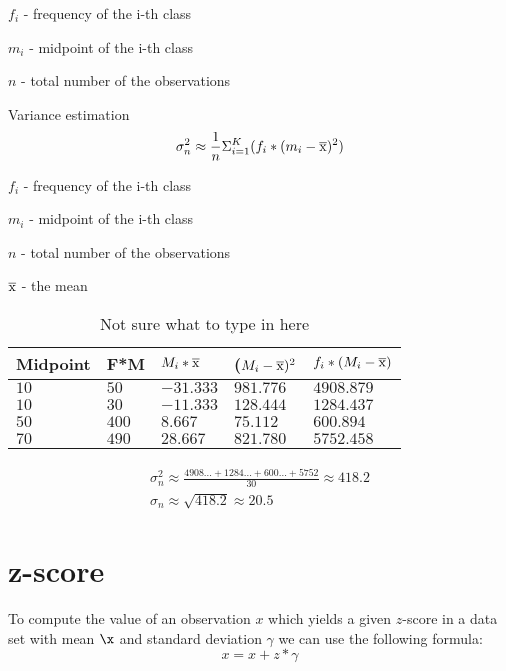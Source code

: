 \documentclass{article}
\begin{document}
$f_i$ - frequency of the i-th class

$m_i$ - midpoint of the i-th class

$n$ - total number of the observations

Variance estimation
\begin{equation}
  \sigma^2_n \approx \frac{1}{n}\Sigma^K_{i=1}(f_i * (m_i - \overline{\rm x})^2)
\end{equation}

$f_i$ - frequency of the i-th class

$m_i$ - midpoint of the i-th class

$n$ - total number of the observations

$\overline{\rm x}$ - the mean

\begin{table}[htbp]
  \centering
  \begin{tabular}{|l|l|l|l|l|}
    \hline
    \textbf{Midpoint} & \textbf{F*M} & \textbf{$M_i * \overline{\rm x}$} & \textbf{($M_i - \overline{\rm x})^2$} & \textbf{$f_i * (M_i - \overline{\rm x})$} \\
    \hline
    $10$ & $50$ & $-31.333$ & $981.776$ & $4908.879$ \\
    \hline
    $10$ & $30$ & $-11.333$ & $128.444$ & $1284.437$ \\
    \hline
    $50$ & $400$ & $8.667$ & $75.112$ & $600.894$ \\
    \hline
    $70$ & $490$ & $28.667$ & $821.780$ & $5752.458$  \\
    \hline
  \end{tabular}
  \caption{Not sure what to type in here}
  \label{tab:estimating_a_mean_and_variance_3}
\end{table}
\begin{equation}
  \begin{gathered}
    \sigma^2_n \approx \frac{4908... + 1284... + 600... + 5752}{30} \approx 418.2  \\
    \sigma_n \approx \sqrt{418.2} \approx 20.5
  \end{gathered}
\end{equation}
\section{z-score}
To compute the value of an observation $x$ which yields a given $z$-score in a data set
with mean $\x$ and standard deviation $\gamma$ we can use the following formula:
\begin{equation}
  x = x + z * \gamma
\end{equation}
\end{document}
